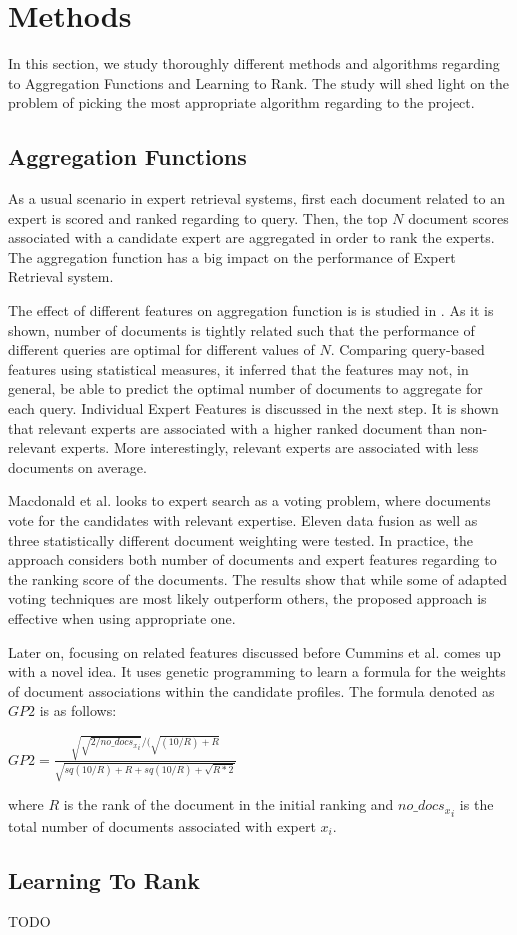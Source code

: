 \section{Methods}
\label{sec:methods}
In this section, we study thoroughly different methods and algorithms regarding to Aggregation Functions and Learning to Rank. The study will shed light on the problem of picking the most appropriate algorithm regarding to the project.

\subsection{Aggregation Functions}
As a usual scenario in expert retrieval systems, first each document related to an expert is scored and ranked regarding to query. Then, the top $N$ document scores associated with a candidate expert are aggregated in order to rank the experts. The aggregation function has a big impact on the performance of Expert Retrieval system.

The effect of different features on aggregation function is is studied in \cite{agg-gp2}. As it is shown, number of documents is tightly related such that the performance of different queries are optimal for different values of $N$. Comparing query-based features using statistical measures, it inferred that the features may not, in general, be able to predict the optimal number of documents to aggregate for each query. Individual Expert Features is discussed in the next step. It is shown that relevant experts are associated with a higher ranked document than non-relevant experts. More interestingly, relevant experts are associated with less documents on average.

Macdonald et al.\cite{agg-vote} looks to expert search as a voting problem, where documents vote for the candidates with relevant expertise. Eleven data fusion as well as three statistically different document weighting were tested. In practice, the approach considers both number of documents and expert features regarding to the ranking score of the documents. The results show that while some of adapted voting techniques are most likely outperform others, the proposed approach is effective when using appropriate one.

Later on, focusing on related features discussed before Cummins et al.\cite{agg-gp2} comes up with a novel idea. It uses genetic programming to learn a formula for the weights of document associations within the candidate profiles. The formula denoted as $GP2$ is as follows:

$GP2 = \frac{\sqrt{\sqrt{2/{no\_docs_x}_i}}/(\sqrt{(10/R)+R}}{\sqrt{sq(10/R)+R+sq(10/R)+\sqrt{R*2}}}$

where $R$ is the rank of the document in the initial ranking and ${no\_docs_x}_i$ is the total number of documents associated with expert $x_i$.

\subsection{Learning To Rank}
TODO